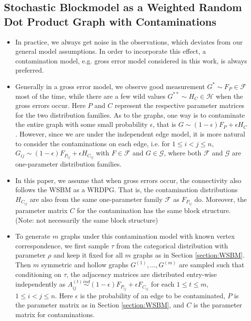 \documentclass[a4paper]{article}
\begin{document}
\subsection{Stochastic Blockmodel as a Weighted Random Dot Product Graph with Contaminations}
\label{section:Contamination}
\begin{itemize}
\item In practice, we always get noise in the observations, which deviates from our general model assumptions. In order to incorporate this effect, a contamination model, e.g. gross error model \cite{AIC:AIC690280519, bickel2001mathematical} considered in this work, is always preferred.
\item Generally in a gross error model, we observe good measurement $G^* \sim F_P \in \mathcal{F}$ most of the time, while there are a few wild values $G^{**} \sim H_C \in \mathcal{H}$ when the gross errors occur. Here $P$ and $C$ represent the respective parameter matrices for the two distribution families.
As to the graphs, one way is to contaminate the entire graph with some small probability $\epsilon$, that is $G \sim (1-\epsilon) F_P + \epsilon H_C$. However, since we are under the independent edge model, it is more natural to consider the contaminations on each edge, i.e. for $1 \le i <  j \le n$, $G_{ij} \sim (1-\epsilon) F_{P_{ij}} + \epsilon H_{C_{ij}}$ with $F \in \mathcal{F}$ and $G \in \mathcal{G}$, where both $\mathcal{F}$ and $\mathcal{G}$ are one-parameter distribution families.
\item In this paper, we assume that when gross errors occur, the connectivity also follows the WSBM as a WRDPG. That is, the contamination distributions $H_{C_{ij}}$ are also from the same one-parameter family $\mathcal{F}$ as $F_{P_{ij}}$ do. Moreover, the parameter matrix $C$ for the contamination has the same block structure. (Note: not necessarily the same block structure)
\item To generate $m$ graphs under this contamination model with known vertex correspondence, we first sample $\tau$ from the categorical distribution with parameter $\rho$ and keep it fixed for all $m$ graphs as in Section \ref{section:WSBM}. Then $m$ symmetric and hollow graphs $G^{(1)}, \dotsc, G^{(m)}$ are sampled such that conditioning on $\tau$, the adjacency matrices are distributed entry-wise independently as $A^{(t)}_{ij} \stackrel{ind}{\sim} (1-\epsilon) F_{P_{ij}} + \epsilon F_{C_{ij}}$ for each $1 \le t \le m$, $1 \le i < j \le n$. Here $\epsilon$ is the probability of an edge to be contaminated, $P$ is the parameter matrix as in Section \ref{section:WSBM}, and $C$ is the parameter matrix for contaminations.
\end{itemize}
\end{document}
